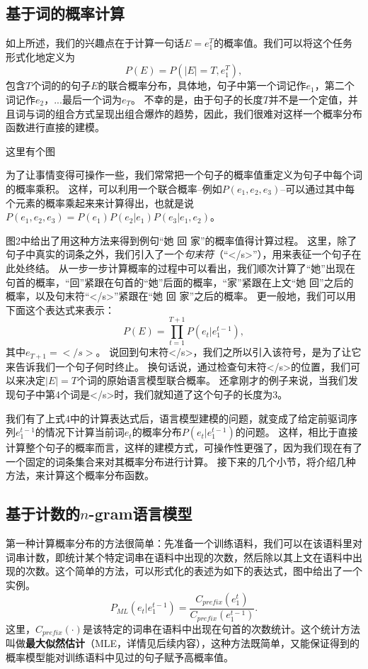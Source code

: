 \documentclass[10pt,a4paper]{ctexart}
\begin{document}
\subsection{基于词的概率计算}
如上所述，我们的兴趣点在于计算一句话$E=e_1^T$的概率值。我们可以将这个任务形式化地定义为
\[
  P(E) = P(|E| = T,e_1^T),
\]
包含$T$个词的的句子$E$的联合概率分布，具体地，句子中第一个词记作$e_1$，第二个词记作$e_2$，...最后一个词为$e_T$。
不幸的是，由于句子的长度$T$并不是一个定值，并且词与词的组合方式呈现出组合爆炸的趋势，因此，我们很难对这样一个概率分布函数进行直接的建模。

这里有个图

为了让事情变得可操作一些，我们常常把一个句子的概率值重定义为句子中每个词的概率乘积。
这样，可以利用一个联合概率--例如$P(e_1,e_2,e_3)$--可以通过其中每个元素的概率乘起来来计算得出，也就是说$P(e_1,e_2,e_3)=P(e_1)P(e_2|e_1)P(e_3|e_1,e_2)$。

图2中给出了用这种方法来得到例句“她 回 家”的概率值得计算过程。
这里，除了句子中真实的词条之外，我们引入了一个\textit{句末符}（“</s>”），用来表征一个句子在此处终结。
从一步一步计算概率的过程中可以看出，我们顺次计算了“她”出现在句首的概率，“回”紧跟在句首的“她”后面的概率，“家”紧跟在上文“她 回”之后的概率，以及句末符“</s>”紧跟在“她 回 家”之后的概率。
更一般地，我们可以用下面这个表达式来表示：
\[
 P(E) = \prod_{t=1}^{T+1} P(e_t|e_1^{t-1}),
\]
其中$e_{T+1}=</s>$。
说回到句末符</s>，我们之所以引入该符号，是为了让它来告诉我们一个句子何时终止。
换句话说，通过检查句末符</s>的位置，我们可以来决定$|E|=T$个词的原始语言模型联合概率。
还拿刚才的例子来说，当我们发现句子中第4个词是</s>时，我们就知道了这个句子的长度为3。

我们有了上式4中的计算表达式后，语言模型建模的问题，就变成了给定前驱词序列$e_1^{t-1}$的情况下计算当前词$e_t$的概率分布$P(e_t|e_1^{t-1})$的问题。
这样，相比于直接计算整个句子的概率而言，这样的建模方式，可操作性更强了，因为我们现在有了一个固定的词条集合来对其概率分布进行计算。
接下来的几个小节，将介绍几种方法，来计算这个概率分布函数。


\subsection{基于计数的$n$-gram语言模型}
第一种计算概率分布的方法很简单：先准备一个训练语料，我们可以在该语料里对词串计数，即统计某个特定词串在语料中出现的次数，然后除以其上文在语料中出现的次数。这个简单的方法，可以形式化的表述为如下的表达式，图中给出了一个实例。
\[
  P_{ML}(e_t|e_1^{t-1})=\frac{C_{prefix}(e_1^t)}{C_{prefix}(e_1^{t-1})}.
\]
这里，$C_{prefix}(\cdot)$是该特定的词串在语料中出现在句首的次数统计。这个统计方法叫做\textbf{最大似然估计}（MLE，详情见后续内容），这种方法既简单，又能保证得到的概率模型能对训练语料中见过的句子赋予高概率值。
\end{document}
